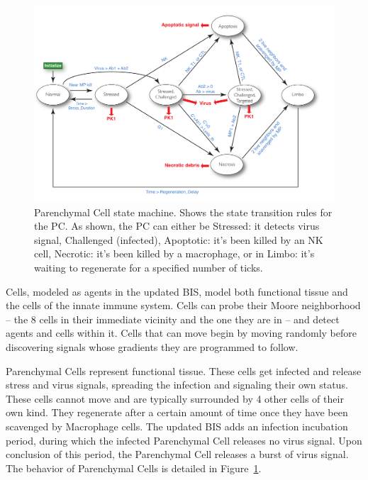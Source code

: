 \documentclass[10pt,conference]{IEEEtran}
\begin{document}
\begin{figure}[h]
\centering
\captionsetup{justification=centering,width=7.0in}
\includegraphics[width=7in]{PC_fsm}
\caption{Parenchymal Cell state machine. Shows the state transition rules for
    the PC\@. As shown, the PC can either be Stressed: it detects virus signal,
    Challenged (infected), Apoptotic: it's been killed by an NK cell, Necrotic:
    it's been killed by a macrophage, or in Limbo: it's waiting to regenerate
    for a specified number of ticks.}
\label{PC_fsm}
\end{figure}

Cells, modeled as agents in the updated BIS, model both functional tissue and
the cells of the innate immune system. Cells can probe their Moore neighborhood
-- the 8 cells in their immediate vicinity and the one they are in -- and
detect agents and cells within it. Cells that can move begin by moving randomly
before discovering signals whose gradients they are programmed to follow.

\indent
Parenchymal Cells represent functional tissue. These cells get infected and
release stress and virus signals, spreading the infection and signaling their
own status. These cells cannot move and are typically surrounded by 4 other
cells of their own kind. They regenerate after a certain amount of time once
they have been scavenged by Macrophage cells. The updated BIS adds an infection
incubation period, during which the infected Parenchymal Cell releases no virus
signal. Upon conclusion of this period, the Parenchymal Cell releases a burst
of virus signal. The behavior of Parenchymal Cells is detailed in
Figure~\ref{PC_fsm}.
\end{document}
